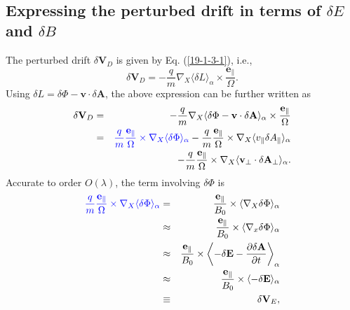\documentclass{article}
\newcommand{\tmcolor}[2]{{\color{#1}{#2}}}
\begin{document}
\

\subsection{Expressing the perturbed drift in terms of $\delta E$ and $\delta
B$}\label{19-3-28-e1}\label{16-10-13-1}

The perturbed drift $\delta \mathbf{V}_D$ is given by Eq. (\ref{19-1-3-1}),
i.e.,
\begin{equation}
  \delta \mathbf{V}_D = - \frac{q}{m} \nabla_X \langle \delta L
  \rangle_{\alpha} \times \frac{\mathbf{e}_{\parallel}}{\Omega} .
\end{equation}
Using $\delta L = \delta \Phi -\mathbf{v} \cdot \delta \mathbf{A}$, the above
expression can be further written as
\begin{eqnarray}
  \delta \mathbf{V}_D & = & - \frac{q}{m} \nabla_X \langle \delta \Phi
  -\mathbf{v} \cdot \delta \mathbf{A} \rangle_{\alpha} \times
  \frac{\mathbf{e}_{\parallel}}{\Omega} \nonumber\\
  & = & \tmcolor{blue}{\frac{q}{m}  \frac{\mathbf{e}_{\parallel}}{\Omega}
  \times \nabla_X \langle \delta \Phi \rangle_{\alpha}} - \frac{q}{m} 
  \frac{\mathbf{e}_{\parallel}}{\Omega} \times \nabla_X \langle v_{\parallel}
  \delta A_{\parallel} \rangle_{\alpha} \nonumber\\
  &  & - \frac{q}{m}  \frac{\mathbf{e}_{\parallel}}{\Omega} \times \nabla_X
  \langle \mathbf{v}_{\perp} \cdot \delta \mathbf{A}_{\perp} \rangle_{\alpha}
  .  \label{18-9-14-p1}
\end{eqnarray}
Accurate to order $O (\lambda)$, the term involving $\delta \Phi$ is
\begin{eqnarray}
  \tmcolor{blue}{\frac{q}{m}  \frac{\mathbf{e}_{\parallel}}{\Omega} \times
  \nabla_X \langle \delta \Phi \rangle_{\alpha}} & = & 
  \frac{\mathbf{e}_{\parallel}}{B_0} \times \langle \nabla_X \delta \Phi
  \rangle_{\alpha} \nonumber\\
  & \approx &  \frac{\mathbf{e}_{\parallel}}{B_0} \times \langle \nabla_x
  \delta \Phi \rangle_{\alpha} \nonumber\\
  & \approx &  \frac{\mathbf{e}_{\parallel}}{B_0} \times \left\langle -
  \delta \mathbf{E}- \frac{\partial \delta \mathbf{A}}{\partial t}
  \right\rangle_{\alpha} \nonumber\\
  & \approx &  \frac{\mathbf{e}_{\parallel}}{B_0} \times \langle - \delta
  \mathbf{E} \rangle_{\alpha} \nonumber\\
  & \equiv & \delta \mathbf{V}_E,  \label{17-5-7-1}
\end{eqnarray}
\end{document}

